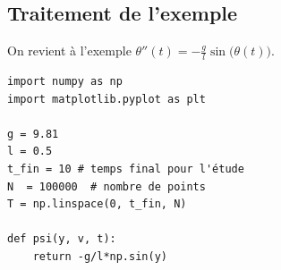 \subsection{Traitement de l'exemple}
On revient à l'exemple $\theta''(t) = -\frac g l \sin\bigl(\theta(t)\bigr)$.
\begin{lstlisting}
import numpy as np
import matplotlib.pyplot as plt

g = 9.81
l = 0.5 
t_fin = 10 # temps final pour l'étude
N  = 100000  # nombre de points
T = np.linspace(0, t_fin, N)

def psi(y, v, t):
    return -g/l*np.sin(y)
\end{lstlisting}
\newpage
